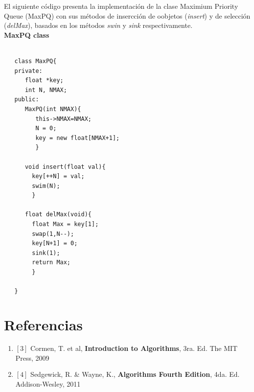 \documentclass[letterpaper]{article}
\begin{document}
El siguiente código presenta la implementación de la clase Maximium Priority Queue (MaxPQ) con sus métodos de insercción de oobjetos (\textit{insert}) y de selección (\textit{delMax}), basados en los métodos \textit{swin} y \textit{sink} respectivamente.\\

{\large\textbf{MaxPQ class}}

\begin{lstlisting}

   class MaxPQ{
   private:
      float *key;
      int N, NMAX;
   public:
      MaxPQ(int NMAX){
         this->NMAX=NMAX;
         N = 0;	
         key = new float[NMAX+1];
         }
         
      void insert(float val){
      	key[++N] = val;
      	swim(N);
      	}
      
      float delMax(void){
      	float Max = key[1];
      	swap(1,N--);
      	key[N+1] = 0;
      	sink(1);
      	return Max;
      	}

   }

\end{lstlisting}

\section{Referencias}

\begin{enumerate}
\item $[3]$ Cormen, T. et al, \textbf{Introduction to Algorithms}, 3ra. Ed. The MIT Press, 2009
\item $[4]$ Sedgewick, R. \& Wayne, K., \textbf{Algorithms Fourth Edition}, 4da. Ed. Addison-Wesley, 2011
\end{enumerate}
	
\end{document}
